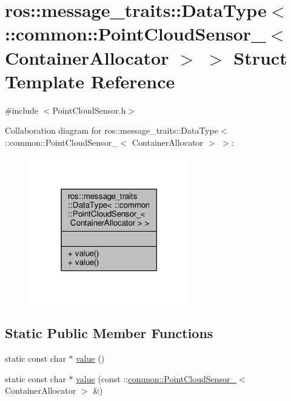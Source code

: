 \hypertarget{structros_1_1message__traits_1_1DataType_3_01_1_1common_1_1PointCloudSensor___3_01ContainerAllocator_01_4_01_4}{}\section{ros\+:\+:message\+\_\+traits\+:\+:Data\+Type$<$ \+:\+:common\+:\+:Point\+Cloud\+Sensor\+\_\+$<$ Container\+Allocator $>$ $>$ Struct Template Reference}
\label{structros_1_1message__traits_1_1DataType_3_01_1_1common_1_1PointCloudSensor___3_01ContainerAllocator_01_4_01_4}


{\ttfamily \#include $<$Point\+Cloud\+Sensor.\+h$>$}



Collaboration diagram for ros\+:\+:message\+\_\+traits\+:\+:Data\+Type$<$ \+:\+:common\+:\+:Point\+Cloud\+Sensor\+\_\+$<$ Container\+Allocator $>$ $>$\+:\nopagebreak
\begin{figure}[H]
\begin{center}
\leavevmode
\includegraphics[width=198pt]{dd/d54/structros_1_1message__traits_1_1DataType_3_01_1_1common_1_1PointCloudSensor___3_01ContainerAllocator_01_4_01_4__coll__graph}
\end{center}
\end{figure}
\subsection*{Static Public Member Functions}
\begin{DoxyCompactItemize}
\item 
static const char $\ast$ \hyperlink{structros_1_1message__traits_1_1DataType_3_01_1_1common_1_1PointCloudSensor___3_01ContainerAllocator_01_4_01_4_a1e40628b6aa5c5ed2d3214d409667bfb}{value} ()
\item 
static const char $\ast$ \hyperlink{structros_1_1message__traits_1_1DataType_3_01_1_1common_1_1PointCloudSensor___3_01ContainerAllocator_01_4_01_4_a3cb78bbae4b78b97e0051c6a08f2d553}{value} (const \+::\hyperlink{structcommon_1_1PointCloudSensor__}{common\+::\+Point\+Cloud\+Sensor\+\_\+}$<$ Container\+Allocator $>$ \&)
\end{DoxyCompactItemize}


